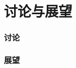 \section{讨论与展望}

\begin{frame}
  \frametitle{讨论}
\end{frame}

\begin{frame}
  \frametitle{展望}
\end{frame}
